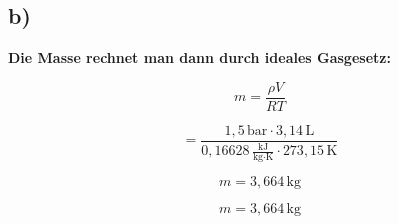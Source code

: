 

\subsection*{b)}

\textbf{Die Masse rechnet man dann durch ideales Gasgesetz:}

\[
m = \frac{\rho V}{R T}
\]

\[
= \frac{1,5 \, \text{bar} \cdot 3,14 \, \text{L}}{0,16628 \, \frac{\text{kJ}}{\text{kg} \cdot \text{K}} \cdot 273,15 \, \text{K}}
\]

\[
m = 3,664 \, \text{kg}
\]

\[
\boxed{m = 3,664 \, \text{kg}}
\]